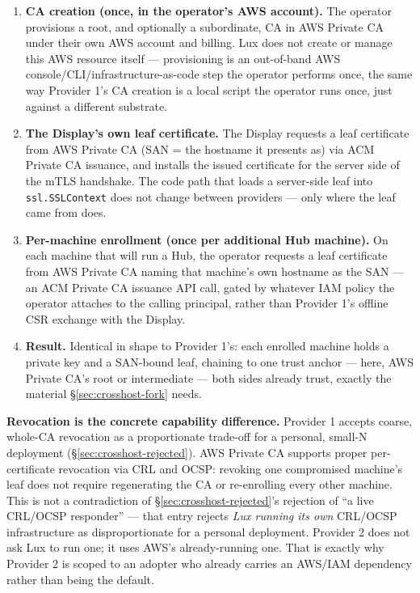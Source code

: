 \documentclass[a4paper,10pt]{article}
\newcommand{\field}[1]{\texttt{#1}}
\begin{document}
\begin{enumerate}
  \item \textbf{CA creation (once, in the operator's AWS account).}  The
    operator provisions a root, and optionally a subordinate, CA in AWS
    Private CA under their own AWS account and billing.  Lux does not
    create or manage this AWS resource itself --- provisioning is an
    out-of-band AWS console/CLI/infrastructure-as-code step the operator
    performs once, the same way Provider 1's CA creation is a local
    script the operator runs once, just against a different substrate.
  \item \textbf{The Display's own leaf certificate.}  The Display
    requests a leaf certificate from AWS Private CA (SAN = the hostname
    it presents as) via ACM Private CA issuance, and installs the issued
    certificate for the server side of the mTLS handshake.  The code
    path that loads a server-side leaf into \field{ssl.SSLContext} does
    not change between providers --- only where the leaf came from does.
  \item \textbf{Per-machine enrollment (once per additional Hub machine).}
    On each machine that will run a Hub, the operator requests a leaf
    certificate from AWS Private CA naming that machine's own hostname as
    the SAN --- an ACM Private CA issuance API call, gated by whatever
    IAM policy the operator attaches to the calling principal,
    rather than Provider 1's offline CSR exchange with the Display.
  \item \textbf{Result.}  Identical in shape to Provider 1's: each
    enrolled machine holds a private key and a SAN-bound leaf, chaining
    to one trust anchor --- here, AWS Private CA's root or intermediate
    --- both sides already trust, exactly the material
    \S\ref{sec:crosshost-fork} needs.
\end{enumerate}

\textbf{Revocation is the concrete capability difference.}  Provider 1
accepts coarse, whole-CA revocation as a proportionate trade-off for a
personal, small-N deployment (\S\ref{sec:crosshost-rejected}).  AWS
Private CA supports proper per-certificate revocation via CRL
and OCSP: revoking one compromised machine's leaf does not
require regenerating the CA or re-enrolling every other machine.  This is
not a contradiction of \S\ref{sec:crosshost-rejected}'s rejection of ``a
live CRL/OCSP responder'' --- that entry rejects \emph{Lux running its
own} CRL/OCSP infrastructure as disproportionate for a personal
deployment.  Provider 2 does not ask Lux to run one; it uses AWS's
already-running one.  That is exactly why Provider 2 is scoped to an
adopter who already carries an AWS/IAM dependency rather than
being the default.
\end{document}
